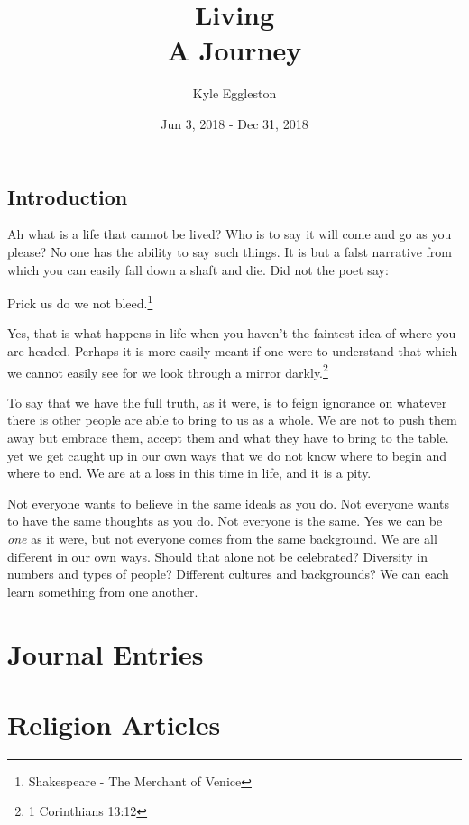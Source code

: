 \documentclass{book}
\title{%
  Living \\
  \large A Journey}
\author{Kyle Eggleston}
\date{Jun 3, 2018 - Dec 31, 2018}
\begin{document}
\maketitle
\thispagestyle{empty}

\frontmatter

\section*{Introduction}

Ah what is a life that cannot be lived? Who is to say it will come and go as you
please? No one has the ability to say such things. It is but a falst narrative
from which you can easily fall down a shaft and die. Did not the poet say:

\begin{displayquote}
Prick us do we not bleed.\footnote{Shakespeare - The Merchant of Venice}
\end{displayquote}

Yes, that is what happens in life when you haven't the faintest idea of where
you are headed. Perhaps it is more easily meant if one were to understand that
which we cannot easily see for we look through a mirror 
darkly.\footnote{1 Corinthians 13:12}

To say that we have the full truth, as it were, is to feign ignorance on 
whatever there is other people are able to bring to us as a whole. We are not to 
push them away but embrace them, accept them and what they have to bring to the
table. yet we get caught up in our own ways that we do not know where to begin
and where to end. We are at a loss in this time in life, and it is a pity.

Not everyone wants to believe in the same ideals as you do. Not everyone wants
to have the same thoughts as you do. Not everyone is the same. Yes we can be 
\textit{one} as it were, but not everyone comes from the same background. We 
are all different in our own ways. Should that alone not be celebrated?
Diversity in numbers and types of people? Different cultures and backgrounds? We
can each learn something from one another.

\mainmatter

\chapter{Journal Entries}







\chapter{Religion Articles}










\newpage

\appendix




\backmatter
\printbibliography
\end{document}
